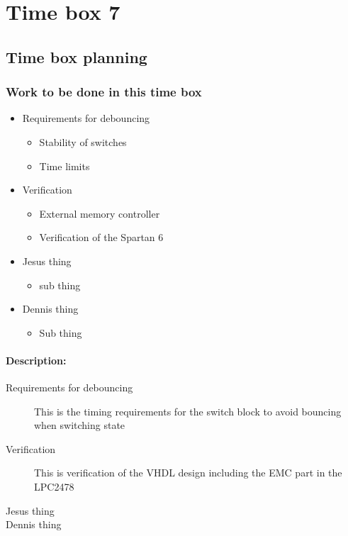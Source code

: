 \section{Time box 7}
\listoftodos
\subsection{Time box planning}

\begin{figure}[H]
	\begin{centering}
	\end{centering}
\end{figure}

\subsubsection{Work to be done in this time box}
\begin{itemize}
	\item Requirements for debouncing
	\begin{itemize}
		\item Stability of switches
		\item Time limits
	\end{itemize}
	\item Verification
	\begin{itemize}
		\item External memory controller
		\item Verification of the Spartan 6
	\end{itemize}
	\item Jesus thing
		\begin{itemize}
			\item sub thing
		\end{itemize}
	\item Dennis thing
	\begin{itemize}
		\item Sub thing
	\end{itemize}
\end{itemize}

\paragraph{Description:}
\begin{description}
	\item[Requirements for debouncing] This is the timing requirements for the switch block to avoid bouncing when switching state
	\item[Verification] This is verification of the VHDL design including the EMC part in the LPC2478
	\item[Jesus thing]
	\item[Dennis thing]
\end{description}

